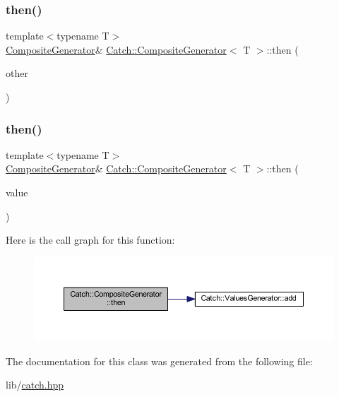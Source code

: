 \subsubsection{\texorpdfstring{then()}{then()}\hspace{0.1cm}{\footnotesize\ttfamily [1/2]}}
{\footnotesize\ttfamily template$<$typename T$>$ \\
\hyperlink{class_catch_1_1_composite_generator}{Composite\+Generator}\& \hyperlink{class_catch_1_1_composite_generator}{Catch\+::\+Composite\+Generator}$<$ T $>$\+::then (\begin{DoxyParamCaption}\item[{\hyperlink{class_catch_1_1_composite_generator}{Composite\+Generator}$<$ T $>$ \&}]{other }\end{DoxyParamCaption})\hspace{0.3cm}{\ttfamily [inline]}}

\hypertarget{class_catch_1_1_composite_generator_aefdc11bcfccdf07d2db5f0da3ed8758c}{}\label{class_catch_1_1_composite_generator_aefdc11bcfccdf07d2db5f0da3ed8758c} 
\subsubsection{\texorpdfstring{then()}{then()}\hspace{0.1cm}{\footnotesize\ttfamily [2/2]}}
{\footnotesize\ttfamily template$<$typename T$>$ \\
\hyperlink{class_catch_1_1_composite_generator}{Composite\+Generator}\& \hyperlink{class_catch_1_1_composite_generator}{Catch\+::\+Composite\+Generator}$<$ T $>$\+::then (\begin{DoxyParamCaption}\item[{T}]{value }\end{DoxyParamCaption})\hspace{0.3cm}{\ttfamily [inline]}}

Here is the call graph for this function\+:\nopagebreak
\begin{figure}[H]
\begin{center}
\leavevmode
\includegraphics[width=350pt]{class_catch_1_1_composite_generator_aefdc11bcfccdf07d2db5f0da3ed8758c_cgraph}
\end{center}
\end{figure}


The documentation for this class was generated from the following file\+:\begin{DoxyCompactItemize}
\item 
lib/\hyperlink{catch_8hpp}{catch.\+hpp}\end{DoxyCompactItemize}
